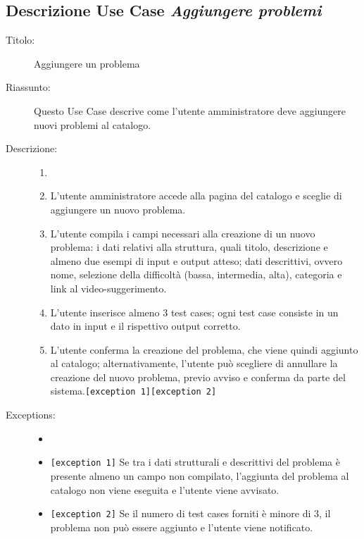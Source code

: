 \documentclass[11pt, a4paper]{article}
\theoremstyle{definition} %
\begin{document}
\newpage
\subsection*{Descrizione Use Case \textit{Aggiungere problemi}}
\begin{description}
    \item[Titolo:] Aggiungere un problema
    
    \item[Riassunto:] Questo Use Case descrive come l'utente amministratore
    deve aggiungere nuovi problemi al catalogo.

    \item[Descrizione:]
    \begin{enumerate}
        \item[]
        \item L'utente amministratore accede alla pagina del catalogo e sceglie di aggiungere un nuovo problema.
        \item L'utente compila i campi necessari alla creazione di un nuovo problema: i dati relativi alla struttura, quali titolo, descrizione e almeno due esempi di input e output atteso; dati descrittivi, ovvero nome, selezione della difficoltà (bassa, intermedia, alta), categoria e link al video-suggerimento.
        \item L'utente inserisce almeno 3 test cases; ogni test case consiste in un dato in input e il rispettivo output corretto.
        \item L'utente conferma la creazione del problema, che viene quindi aggiunto al catalogo; alternativamente, l'utente può scegliere di annullare la creazione del nuovo problema, previo avviso e conferma da parte del sistema.\texttt{[exception 1]}\texttt{[exception 2]}
    \end{enumerate}
    
    \item[Exceptions:]
    \begin{itemize}
        \item[]
        \item \texttt{[exception 1]} Se tra i dati strutturali e descrittivi del problema è presente almeno un campo non compilato, l'aggiunta del problema al catalogo non viene eseguita e l'utente viene avvisato.
        \item \texttt{[exception 2]} Se il numero di test cases forniti è minore di 3, il problema non può essere aggiunto e l'utente viene notificato.
    \end{itemize}
\end{description}
\end{document}
